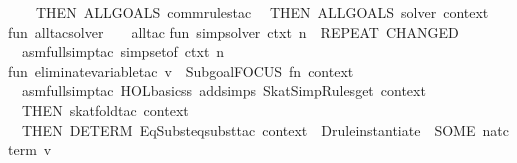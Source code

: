 \begin{isabellebody}
\ \ \ \ THEN\ ALLGOALS\ {}comm{}rules{}tac{}{}\isanewline
\ \ THEN\ ALLGOALS\ {}solver\ context{}{}\isanewline
\isanewline
fun\ all{}tac{}solver\ {}\ {}\ {}\ all{}tac\isanewline
\isanewline
fun\ simp{}solver\ ctxt\ n\ {}\ REPEAT\ {}CHANGED\isanewline
\ \ {}asm{}full{}simp{}tac\ {}simpset{}of\ ctxt{}\ n\ {}{}\isanewline
\isanewline
fun\ eliminate{}variable{}tac\ v\ {}\ Subgoal{}FOCUS\ {}fn\ {}context{}\ {}{}{}{}\ {}{}\isanewline
\ \ asm{}full{}simp{}tac\ {}HOL{}basic{}ss\ addsimps\ SkatSimpRules{}get\ context{}\ {}\isanewline
\ \ THEN\ skat{}fold{}tac\ context\ {}\isanewline
\ \ THEN\ DETERM\ {}EqSubst{}eqsubst{}tac\ context\ {}{}{}\ {}Drule{}instantiate{}\ {}{}\ {}SOME\ {}nat{}cterm\ v{}{}\ %

\end{isabellebody}
